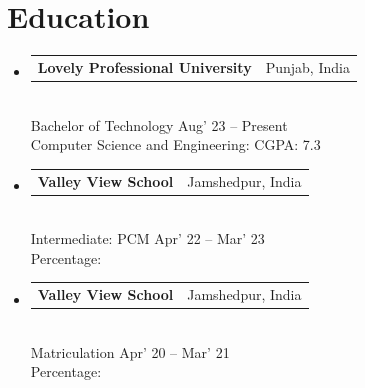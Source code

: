 \documentclass[10pt, a4paper]{article}
\makeatletter
\newcommand{\instituterow}[2]{%
  \noindent\begin{tabularx}{\linewidth}{@{}X@{\hspace{4pt}}r@{}}
    {\color{headingblue}\bfseries\fontsize{10pt}{12pt}\selectfont #1} &
    {\fontsize{8.5pt}{10pt}\selectfont #2}
  \end{tabularx}%
}
\makeatother
\begin{document}
\section{Education}
\vspace{4pt}
\begin{itemize}[itemsep=8pt]

  \item
    \instituterow{Lovely Professional University}{Punjab, India}\\[1pt]
    {\fontsize{8.5pt}{10pt}\selectfont Bachelor of Technology \hfill Aug' 23 -- Present}\\
    {\fontsize{8.5pt}{10pt}\selectfont Computer Science and Engineering: CGPA: 7.3}

  \item
    \instituterow{Valley View School}{Jamshedpur, India}\\[1pt]
    {\fontsize{8.5pt}{10pt}\selectfont Intermediate: PCM \hfill Apr' 22 -- Mar' 23}\\
    {\fontsize{8.5pt}{10pt}\selectfont Percentage:}

  \item
    \instituterow{Valley View School}{Jamshedpur, India}\\[1pt]
    {\fontsize{8.5pt}{10pt}\selectfont Matriculation \hfill Apr' 20 -- Mar' 21}\\
    {\fontsize{8.5pt}{10pt}\selectfont Percentage:}

\end{itemize}
\end{document}
